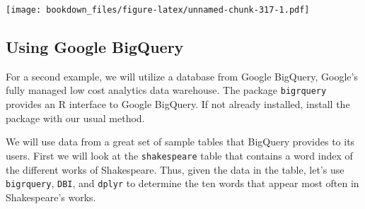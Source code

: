 \documentclass[]{krantz}
\makeatletter
\newenvironment{Shaded}{\begin{snugshade}}{\end{snugshade}}
\newcommand{\KeywordTok}[1]{\textcolor[rgb]{0.27,0.27,0.27}{\textbf{#1}}}
\newcommand{\DataTypeTok}[1]{\textcolor[rgb]{0.27,0.27,0.27}{#1}}
\newcommand{\DecValTok}[1]{\textcolor[rgb]{0.06,0.06,0.06}{#1}}
\newcommand{\StringTok}[1]{\textcolor[rgb]{0.5,0.5,0.5}{#1}}
\newcommand{\OtherTok}[1]{\textcolor[rgb]{0.37,0.37,0.37}{#1}}
\newcommand{\OperatorTok}[1]{\textcolor[rgb]{0.43,0.43,0.43}{\textbf{#1}}}
\newcommand{\NormalTok}[1]{#1}
\newenvironment{kframe}{%
\medskip{}
\setlength{\fboxsep}{.8em}
 \def\at@end@of@kframe{}%
 \ifinner\ifhmode%
  \def\at@end@of@kframe{\end{minipage}}%
  \begin{minipage}{\columnwidth}%
 \fi\fi%
 \def\FrameCommand##1{\hskip\@totalleftmargin \hskip-\fboxsep
 \colorbox{shadecolor}{##1}\hskip-\fboxsep
     \hskip-\linewidth \hskip-\@totalleftmargin \hskip\columnwidth}%
 \MakeFramed {\advance\hsize-\width
   \@totalleftmargin\z@ \linewidth\hsize
   \@setminipage}}%
 {\par\unskip\endMakeFramed%
 \at@end@of@kframe}
\renewenvironment{Shaded}{\begin{kframe}}{\end{kframe}}
\makeatother
\begin{document}
\texttt{[image: bookdown\_files/figure-latex/unnamed-chunk-317-1.pdf]}

\subsection{Using Google BigQuery}\label{using-google-bigquery}

For a second example, we will utilize a database from Google BigQuery,
Google's fully managed low cost analytics data warehouse. The package
\texttt{bigrquery} provides an R interface to Google BigQuery. If not
already installed, install the package with our usual method.

We will use data from a great set of sample tables that BigQuery
provides to its users. First we will look at the \texttt{shakespeare}
table that contains a word index of the different works of Shakespeare.
Thus, given the data in the table, let's use \texttt{bigrquery},
\texttt{DBI}, and \texttt{dplyr} to determine the ten words that appear
most often in Shakespeare's works.

\begin{Shaded}
\end{Shaded}
\end{document}
